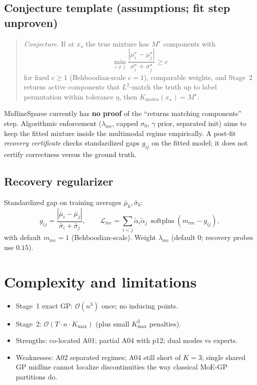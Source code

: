\documentclass[11pt,a4paper]{article}
\newcommand{\softplus}{\operatorname{softplus}}
\newcommand{\Kmodes}{K_{\mathrm{modes}}}
\newcommand{\Kmax}{K_{\max}}
\begin{document}
\subsection{Conjecture template (assumptions; fit step unproven)}
\begin{quote}
\emph{Conjecture.}
If at \(x_\star\) the true mixture has \(M^\star\) components with
\[
  \min_{i\neq j}
  \frac{|\mu_i^\star-\mu_j^\star|}{\sigma_i^\star+\sigma_j^\star}
  \ge c
\]
for fixed \(c\ge 1\) (Behboodian-scale \(c=1\)), comparable weights, and Stage~2 returns
active components that \(L^2\)-match the truth up to label permutation within tolerance
\(\eta\), then \(\Kmodes(x_\star)=M^\star\).
\end{quote}
\noindent
MidlineSparse currently has \textbf{no proof} of the ``returns matching components'' step.
Algorithmic enforcement (\(\lambda_{\mathrm{rec}}\), capped \(\sigma_0\), \(\gamma\) prior,
separated init) aims to keep the fitted mixture inside the multimodal regime empirically.
A post-fit \emph{recovery certificate} checks standardized gaps \(g_{ij}\) on the fitted
model; it does not certify correctness versus the ground truth.

\subsection{Recovery regularizer}
Standardized gap on training averages \(\bar\mu_k,\bar\sigma_k\):
\begin{equation}
  g_{ij}
  =
  \frac{|\bar\mu_i-\bar\mu_j|}{\bar\sigma_i+\bar\sigma_j},
  \qquad
  \mathcal{L}_{\mathrm{rec}}
  =
  \sum_{i<j}
  \tilde\alpha_i\tilde\alpha_j\,
  \softplus(m_{\mathrm{rec}}-g_{ij}),
\end{equation}
with default \(m_{\mathrm{rec}}=1\) (Behboodian-scale). Weight \(\lambda_{\mathrm{rec}}\)
(default \(0\); recovery probes use \(0.15\)).

\section{Complexity and limitations}

\begin{itemize}[leftmargin=*]
  \item Stage~1 exact GP: \(\mathcal{O}(n^3)\) once; no inducing points.
  \item Stage~2: \(\mathcal{O}(T\cdot n\cdot \Kmax)\) (plus small \(\Kmax^2\) penalties).
  \item Strengths: co-located A01; partial A04 with p12; dual modes vs experts.
  \item Weaknesses: A02 separated regimes; A04 still short of \(K{=}3\); single shared
        GP midline cannot localize discontinuities the way classical MoE-GP partitions do.
\end{itemize}
\end{document}
